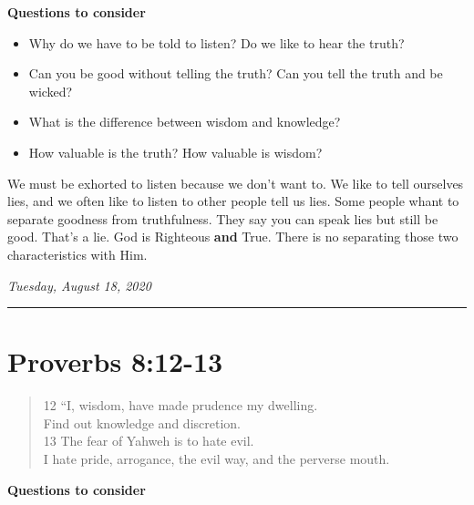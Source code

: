 \documentclass[
]{book}
\providecommand{\tightlist}{%
  \setlength{\itemsep}{0pt}\setlength{\parskip}{0pt}}
\begin{document}
\textbf{Questions to consider}

\begin{itemize}
\tightlist
\item
  Why do we have to be told to listen? Do we like to hear the truth?
\item
  Can you be good without telling the truth? Can you tell the truth and be wicked?
\item
  What is the difference between wisdom and knowledge?
\item
  How valuable is the truth? How valuable is wisdom?
\end{itemize}

We must be exhorted to listen because we don't want to. We like to tell ourselves lies, and we often like to listen to other people tell us lies. Some people whant to separate goodness from truthfulness. They say you can speak lies but still be good. That's a lie. God is Righteous \textbf{and} True. There is no separating those two characteristics with Him.

\emph{Tuesday, August 18, 2020}

\begin{center}\rule{0.5\linewidth}{0.5pt}\end{center}

\hypertarget{proverbs-812-13}{%
\section{Proverbs 8:12-13}\label{proverbs-812-13}}

\begin{quote}
12 ``I, wisdom, have made prudence my dwelling.\\
Find out knowledge and discretion.\\
13 The fear of Yahweh is to hate evil.\\
I hate pride, arrogance, the evil way, and the perverse mouth.
\end{quote}

\textbf{Questions to consider}
\end{document}
